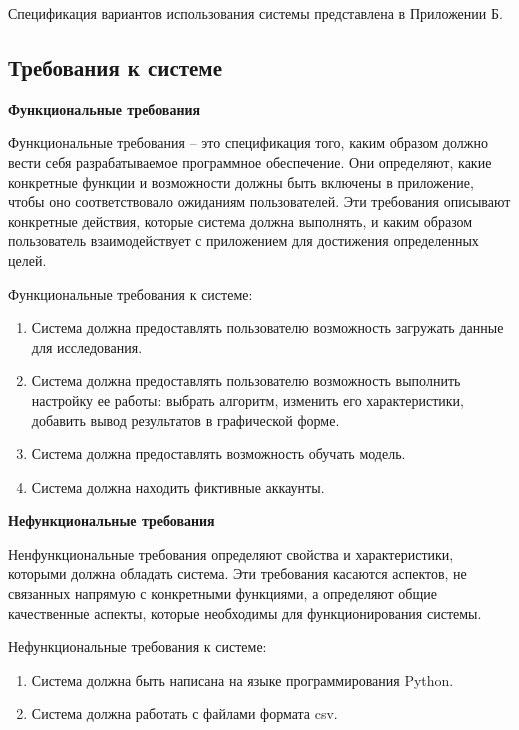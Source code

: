 Спецификация вариантов использования системы представлена в Приложении Б.

\vspace{1.5em}
\subsection{Требования к системе}
\label{subsec:fotmalDefinition}
\textbf{Функциональные требования}

Функциональные требования -- это спецификация того, каким образом должно вести себя разрабатываемое программное обеспечение. Они определяют, какие конкретные функции и возможности должны быть включены в приложение, чтобы оно соответствовало ожиданиям пользователей. Эти требования описывают конкретные действия, которые система должна выполнять, и каким образом пользователь взаимодействует с приложением для достижения определенных целей. 

Функциональные требования к системе:
\vspace{-1.5em}
\begin{enumerate}[itemsep=0pt, topsep=1.5em]
    \item Система должна предоставлять пользователю возможность загружать данные для исследования.
    \item Система должна предоставлять пользователю возможность выполнить настройку ее работы: выбрать алгоритм, изменить его характеристики, добавить вывод результатов в графической форме.
    \item Система должна предоставлять возможность обучать модель.
    \item Система должна находить фиктивные аккаунты.
\end{enumerate}
\vspace{-1.5em}

\textbf{Нефункциональные требования}

Ненфункциональные требования определяют свойства и характеристики, которыми должна обладать система. Эти требования касаются аспектов, не связанных напрямую с конкретными функциями, а определяют общие качественные аспекты, которые необходимы для функционирования системы.

Нефункциональные требования к системе:
\vspace{-1.5em}
\begin{enumerate}[itemsep=0pt, topsep=1.5em]
    \item Система должна быть написана на языке программирования Python.
    \item Система должна работать с файлами формата csv.
\end{enumerate}

